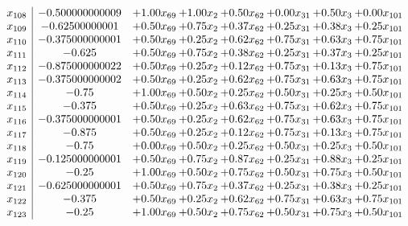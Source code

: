 \documentclass[8pt]{article}
\begin{document}
\[\begin{array}{c| c c@{\hskip 2pt} c@{\hskip 2pt} c@{\hskip 2pt} c@{\hskip 2pt} c@{\hskip 2pt} c@{\hskip 2pt} }
 x_{108}   &  -0.500000000009 & +  1.00 x_{69} & +  1.00 x_{2} & +  0.50 x_{62} & +  0.00 x_{31} & +  0.50 x_{3} & +  0.00 x_{101}\\
 x_{109}   &  -0.62500000001 & +  0.50 x_{69} & +  0.75 x_{2} & +  0.37 x_{62} & +  0.25 x_{31} & +  0.38 x_{3} & +  0.25 x_{101}\\
 x_{110}   &  -0.375000000001 & +  0.50 x_{69} & +  0.25 x_{2} & +  0.62 x_{62} & +  0.75 x_{31} & +  0.63 x_{3} & +  0.75 x_{101}\\
 x_{111}   &  -0.625 & +  0.50 x_{69} & +  0.75 x_{2} & +  0.38 x_{62} & +  0.25 x_{31} & +  0.37 x_{3} & +  0.25 x_{101}\\
 x_{112}   &  -0.875000000022 & +  0.50 x_{69} & +  0.25 x_{2} & +  0.12 x_{62} & +  0.75 x_{31} & +  0.13 x_{3} & +  0.75 x_{101}\\
 x_{113}   &  -0.375000000002 & +  0.50 x_{69} & +  0.25 x_{2} & +  0.62 x_{62} & +  0.75 x_{31} & +  0.63 x_{3} & +  0.75 x_{101}\\
 x_{114}   &  -0.75 & +  1.00 x_{69} & +  0.50 x_{2} & +  0.25 x_{62} & +  0.50 x_{31} & +  0.25 x_{3} & +  0.50 x_{101}\\
 x_{115}   &  -0.375 & +  0.50 x_{69} & +  0.25 x_{2} & +  0.63 x_{62} & +  0.75 x_{31} & +  0.62 x_{3} & +  0.75 x_{101}\\
 x_{116}   &  -0.375000000001 & +  0.50 x_{69} & +  0.25 x_{2} & +  0.62 x_{62} & +  0.75 x_{31} & +  0.63 x_{3} & +  0.75 x_{101}\\
 x_{117}   &  -0.875 & +  0.50 x_{69} & +  0.25 x_{2} & +  0.12 x_{62} & +  0.75 x_{31} & +  0.13 x_{3} & +  0.75 x_{101}\\
 x_{118}   &  -0.75 & +  0.00 x_{69} & +  0.50 x_{2} & +  0.25 x_{62} & +  0.50 x_{31} & +  0.25 x_{3} & +  0.50 x_{101}\\
 x_{119}   &  -0.125000000001 & +  0.50 x_{69} & +  0.75 x_{2} & +  0.87 x_{62} & +  0.25 x_{31} & +  0.88 x_{3} & +  0.25 x_{101}\\
 x_{120}   &  -0.25 & +  1.00 x_{69} & +  0.50 x_{2} & +  0.75 x_{62} & +  0.50 x_{31} & +  0.75 x_{3} & +  0.50 x_{101}\\
 x_{121}   &  -0.625000000001 & +  0.50 x_{69} & +  0.75 x_{2} & +  0.37 x_{62} & +  0.25 x_{31} & +  0.38 x_{3} & +  0.25 x_{101}\\
 x_{122}   &  -0.375 & +  0.50 x_{69} & +  0.25 x_{2} & +  0.62 x_{62} & +  0.75 x_{31} & +  0.63 x_{3} & +  0.75 x_{101}\\
 x_{123}   &  -0.25 & +  1.00 x_{69} & +  0.50 x_{2} & +  0.75 x_{62} & +  0.50 x_{31} & +  0.75 x_{3} & +  0.50 x_{101}\\

\end{array}\]
\end{document}
